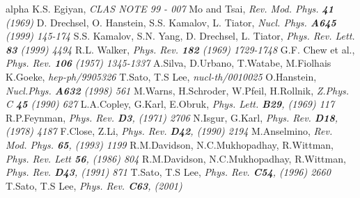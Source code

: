 \begin{thebibliography}{alpha}
      {K.S. Egiyan},                                          \textit{CLAS NOTE 99 - 007}
     {Mo and Tsai},                                          \textit{Rev. Mod. Phys. {\bf 41} (1969)}
   {D. Drechsel,  O. Hanstein,  S.S. Kamalov, L. Tiator},  \textit{Nucl. Phys. {\bf A645} (1999) 145-174}
    {S.S. Kamalov, S.N. Yang, D. Drechsel, L. Tiator},      \textit{Phys. Rev. Lett. {\bf 83} (1999) 4494}
     {R.L. Walker},                                          \textit{Phys. Rev. {\bf 182} (1969) 1729-1748}
       {G.F. Chew et al.},                                     \textit{Phys. Rev. {\bf 106} (1957) 1345-1337}
       {A.Silva, D.Urbano, T.Watabe, M.Fiolhais K.Goeke},      \textit{hep-ph/9905326}
      {T.Sato, T.S Lee},                                      \textit{nucl-th/0010025}
     {O.Hanstein},                                           \textit{Nucl.Phys. {\bf A632} (1998) 561}
     {M.Warns, H.Schroder, W.Pfeil, H.Rollnik},              \textit{Z.Phys. C {\bf 45} (1990) 627}
    {L.A.Copley, G.Karl, E.Obruk},                          \textit{Phys. Lett. {\bf B29}, (1969) 117}
    {R.P.Feynman},                                          \textit{Phys. Rev. {\bf D3}, (1971) 2706}
  {N.Isgur, G.Karl},                                      \textit{Phys. Rev. {\bf D18}, (1978) 4187}
    {F.Close, Z.Li},                                        \textit{Phys. Rev. {\bf D42}, (1990) 2194}
    {M.Anselmino},                                          \textit{Rev. Mod. Phys. {\bf 65}, (1993) 1199}
    {R.M.Davidson, N.C.Mukhopadhay, R.Wittman},             \textit{Phys. Rev. Lett {\bf 56}, (1986) 804}
    {R.M.Davidson, N.C.Mukhopadhay, R.Wittman},             \textit{Phys. Rev. {\bf D43}, (1991) 871}
      {T.Sato, T.S Lee},                                      \textit{Phys. Rev. {\bf C54}, (1996) 2660} 
      {T.Sato, T.S Lee},                                      \textit{Phys. Rev. {\bf C63}, (2001)} 

\end{thebibliography}
